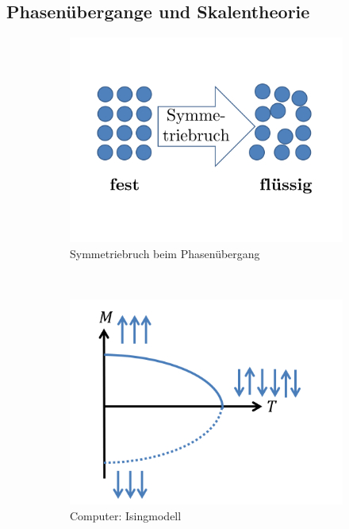 \documentclass[12pt]{article}
\begin{document}
\subsection{Phasenübergange und Skalentheorie}

\begin{figure}[h] 
		\begin{subfigure}[h]{0.5 \textwidth}
		\centering
		\includegraphics[width=\textwidth]{Folie33.png}
		\caption{Symmetriebruch beim Phasenübergang} 
		\label{fig:Symmetriebruch}
		\centering
	\end{subfigure}
	~
\begin{subfigure}[h]{0.5\textwidth}
		\centering
		\includegraphics[width=\textwidth]{Folie34.png}
		\caption{Computer: Isingmodell}
		\label{fig:Computer}
		\centering
	\end{subfigure}
	\caption{ }
\end{figure}	
\end{document}
